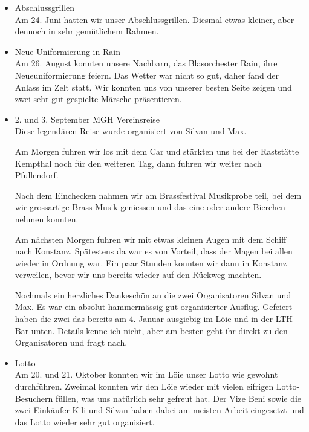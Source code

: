\begin{history}
\begin{itemize}
            \item  Abschlussgrillen\\
                  Am 24. Juni hatten wir unser Abschlussgrillen. Diesmal etwas
                  kleiner, aber dennoch in sehr gemütlichem Rahmen.

            \item  Neue Uniformierung in Rain\\
                  Am 26. August konnten unsere Nachbarn, das Blasorchester Rain,
                  ihre Neueuniformierung feiern. Das Wetter war nicht so gut,
                  daher fand der Anlass im Zelt statt. Wir konnten uns von
                  unserer besten Seite zeigen und zwei sehr gut gespielte
                  Märsche präsentieren.

            \item 2. und 3. September MGH Vereinsreise\\
                  Diese legendären Reise wurde organisiert von Silvan und Max.

                  Am Morgen fuhren wir los mit dem Car und stärkten uns bei der
                  Raststätte Kempthal noch für den weiteren Tag, dann fuhren wir
                  weiter nach Pfullendorf.

                  Nach dem Einchecken nahmen wir am Brassfestival Musikprobe
                  teil, bei dem wir grossartige Brass-Musik geniessen und das
                  eine oder andere Bierchen nehmen konnten.

                  Am nächsten Morgen fuhren wir mit etwas kleinen Augen mit dem
                  Schiff nach Konstanz. Spätestens da war es von Vorteil, dass
                  der Magen bei allen wieder in Ordnung war. Ein paar Stunden
                  konnten wir dann in Konstanz verweilen, bevor wir uns bereits
                  wieder auf den Rückweg machten.

                  Nochmals ein herzliches Dankeschön an die zwei Organisatoren
                  Silvan und Max. Es war ein absolut hammermässig gut
                  organisierter Ausflug. Gefeiert haben die zwei das bereits am
                  4. Januar ausgiebig im Löie und in der LTH Bar unten. Details
                  kenne ich nicht, aber am besten geht ihr direkt zu den
                  Organisatoren und fragt nach.

            \item  Lotto\\
                  Am 20. und 21. Oktober konnten wir im Löie unser Lotto wie
                  gewohnt durchführen. Zweimal konnten wir den Löie wieder mit
                  vielen eifrigen Lotto-Besuchern füllen, was uns natürlich sehr
                  gefreut hat. Der Vize Beni sowie die zwei Einkäufer Kili und
                  Silvan haben dabei am meisten Arbeit eingesetzt und das Lotto
                  wieder sehr gut organisiert.


\end{itemize}
\end{history}
